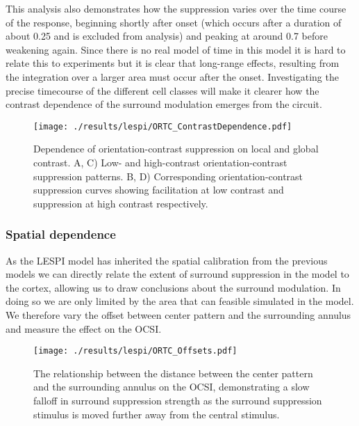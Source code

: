 This analysis also demonstrates how the suppression varies over the
time course of the response, beginning shortly after onset (which
occurs after a duration of about 0.25 and is excluded from analysis)
and peaking at around 0.7 before weakening again. Since there is no
real model of time in this model it is hard to relate this to
experiments but it is clear that long-range effects, resulting from
the integration over a larger area must occur after the
onset. Investigating the precise timecourse of the different cell
classes will make it clearer how the contrast dependence of the
surround modulation emerges from the circuit.

\begin{figure}
	\centering
        \texttt{[image: ./results/lespi/ORTC\_ContrastDependence.pdf]}
	\caption[Dependence of orientation-contrast suppression on local
      and global contrast.]{Dependence of orientation-contrast
      suppression on local and global contrast. A, C) Low- and
      high-contrast orientation-contrast suppression patterns. B, D)
      Corresponding orientation-contrast suppression curves showing
      facilitation at low contrast and suppression at high contrast
      respectively.}
	\label{ORTC_ContrastDependence}
\end{figure}

\subsubsection{Spatial dependence}

As the LESPI model has inherited the spatial calibration from the
previous models we can directly relate the extent of surround
suppression in the model to the cortex, allowing us to draw
conclusions about the surround modulation. In doing so we are only
limited by the area that can feasible simulated in the model. We
therefore vary the offset between center pattern and the surrounding
annulus and measure the effect on the OCSI.

\begin{figure}
	\centering
        \texttt{[image: ./results/lespi/ORTC\_Offsets.pdf]}
	\caption[Spatial dependence of surround suppression.]{The
      relationship between the distance between the center pattern and
      the surrounding annulus on the OCSI, demonstrating a slow
      falloff in surround suppression strength as the surround
      suppression stimulus is moved further away from the central stimulus.}
	\label{ORTC_OffsetCurve}
\end{figure}

